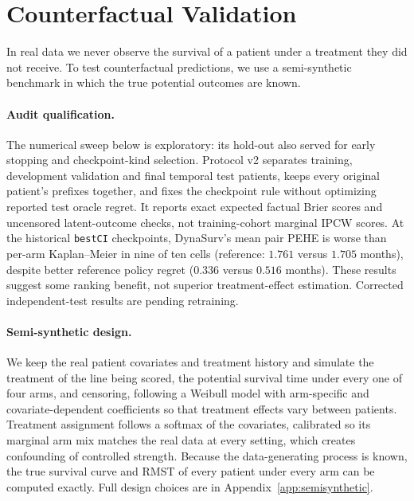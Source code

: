 \documentclass[a4paper,10pt]{article}
\begin{document}
\section{Counterfactual Validation}
\label{sec:counterfactual}

In real data we never observe the survival of a patient under a treatment they did not receive. To test counterfactual predictions, we use a semi-synthetic benchmark in which the true potential outcomes are known.

\paragraph{Audit qualification.} The numerical sweep below is exploratory: its hold-out also served for early stopping and checkpoint-kind selection. Protocol v2 separates training, development validation and final temporal test patients, keeps every original patient's prefixes together, and fixes the checkpoint rule without optimizing reported test oracle regret. It reports exact expected factual Brier scores and uncensored latent-outcome checks, not training-cohort marginal IPCW scores. At the historical \texttt{bestCI} checkpoints, DynaSurv's mean pair PEHE is worse than per-arm Kaplan--Meier in nine of ten cells (reference: $1.761$ versus $1.705$ months), despite better reference policy regret ($0.336$ versus $0.516$ months). These results suggest some ranking benefit, not superior treatment-effect estimation. Corrected independent-test results are pending retraining.

\paragraph{Semi-synthetic design.} We keep the real patient covariates and treatment history and simulate the treatment of the line being scored, the potential survival time under every one of four arms, and censoring, following a Weibull model with arm-specific and covariate-dependent coefficients so that treatment effects vary between patients. Treatment assignment follows a softmax of the covariates, calibrated so its marginal arm mix matches the real data at every setting, which creates confounding of controlled strength. Because the data-generating process is known, the true survival curve and RMST of every patient under every arm can be computed exactly. Full design choices are in Appendix~\ref{app:semisynthetic}.
\end{document}

